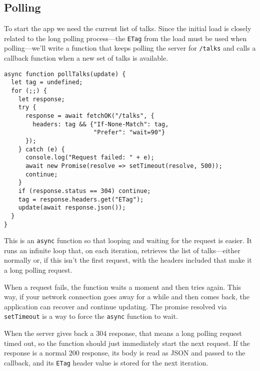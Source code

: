 \subsection{Polling}

To start the app we need the current list of talks. Since the initial load is closely related to the long polling process—the \lstinline`ETag` from the load must be used when polling—we'll write a function that keeps polling the server for \lstinline`/talks` and calls a callback function when a new set of talks is available.

\begin{lstlisting}
async function pollTalks(update) {
  let tag = undefined;
  for (;;) {
    let response;
    try {
      response = await fetchOK("/talks", {
        headers: tag && {"If-None-Match": tag,
                         "Prefer": "wait=90"}
      });
    } catch (e) {
      console.log("Request failed: " + e);
      await new Promise(resolve => setTimeout(resolve, 500));
      continue;
    }
    if (response.status == 304) continue;
    tag = response.headers.get("ETag");
    update(await response.json());
  }
}
\end{lstlisting}
\noindent{}

This is an \lstinline`async` function so that looping and waiting for the request is easier. It runs an infinite loop that, on each iteration, retrieves the list of talks—either normally or, if this isn't the first request, with the headers included that make it a long polling request.

When a request fails, the function waits a moment and then tries again. This way, if your network connection goes away for a while and then comes back, the application can recover and continue updating. The promise resolved via \lstinline`setTimeout` is a way to force the \lstinline`async` function to wait.

When the server gives back a 304 response, that means a long polling request timed out, so the function should just immediately start the next request. If the response is a normal 200 response, its body is read as JSON and passed to the callback, and its \lstinline`ETag` header value is stored for the next iteration.

